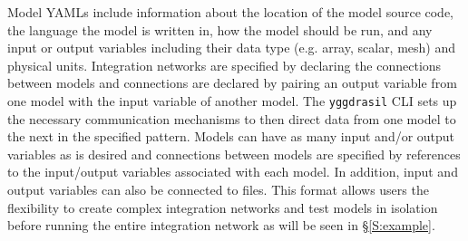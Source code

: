 \documentclass[journal]{IEEEtran}
\newcommand{\pkg}{{\tt yggdrasil}{}}
\newcommand{\A}{Appendix{ }}
\newcommand{\rootyml}{}
\newcommand{\shootyml}{}
\newcommand{\intyml}{}
\begin{document}
Model YAMLs include information about the location of the model source code, the language the model is written in, how the model should be run, and any input or output variables including their data type (e.g. array, scalar, mesh) and physical units. 
%
%
%
%
Integration networks are specified by declaring the connections between models and connections are declared by pairing an output variable from one model with the input variable of another model. The {\pkg} CLI sets up the necessary communication mechanisms to then direct data from one model to the next in the specified pattern. Models can have as many input and/or output variables as is desired and connections between models are specified by references to the input/output variables associated with each model. In addition, input and output variables can also be connected to files.
%
%
%
This format allows users the flexibility to create complex integration networks and test models in isolation before running the entire integration network as will be seen in \S\ref{S:example}.


\end{document}
